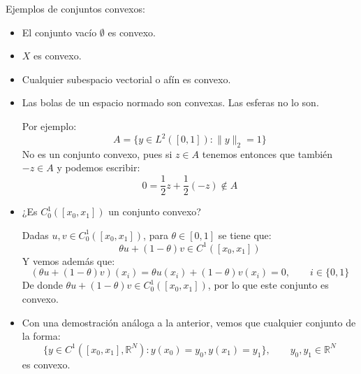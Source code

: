 \begin{ejemplo}
    Ejemplos de conjuntos convexos:
    \begin{itemize}
        \item El conjunto vacío $\emptyset $ es convexo.
        \item $X$ es convexo.
        \item Cualquier subespacio vectorial o afín es convexo.
        \item Las bolas de un espacio normado son convexas. Las esferas no lo son.

            Por ejemplo:
            \begin{equation*}
                A = \{y\in L^2([0,1]) : \|y\|_2 = 1\}
            \end{equation*}
            No es un conjunto convexo, pues si $z\in A$ tenemos entonces que también $-z\in A$ y podemos escribir: 
            \begin{equation*}
                0 = \frac{1}{2}z + \frac{1}{2}(-z)\notin A
            \end{equation*}
        \item ¿Es $C_0^1([x_0,x_1])$ un conjunto convexo?

            Dadas $u,v\in C_0^1([x_0,x_1])$, para $\theta\in [0,1]$ se tiene que:
            \begin{equation*}
                \theta u + (1-\theta)v \in C^1([x_0,x_1])
            \end{equation*}
            Y vemos además que:
            \begin{equation*}
                (\theta u + (1-\theta)v)(x_i) = \theta u(x_i) + (1-\theta)v(x_i) = 0, \qquad i \in \{0,1\}
            \end{equation*}
            De donde $\theta u + (1-\theta)v \in C^1_0([x_0,x_1])$, por lo que este conjunto es convexo.
        \item Con una demostración análoga a la anterior, vemos que cualquier conjunto de la forma:
            \begin{equation*}
                \{y\in C^1([x_0,x_1],\mathbb{R}^N) : y(x_0) = y_0, y(x_1) = y_1\}, \qquad y_0,y_1\in \mathbb{R}^N
            \end{equation*}
            es convexo.
    \end{itemize}
\end{ejemplo}

